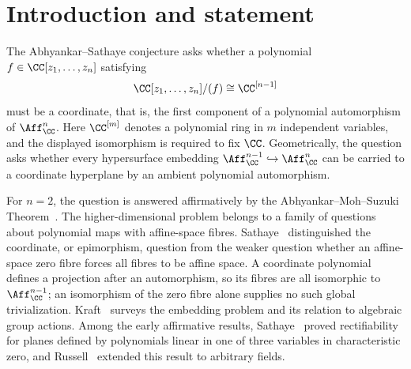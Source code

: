 \begin{abstract}
We construct an explicit counterexample to the Abhyankar--Sathaye conjecture:
a noncoordinate polynomial in four complex variables whose zero fibre is affine
three-space. Adjoining variables gives counterexamples in every ambient
dimension at least four.
\end{abstract}

\section{Introduction and statement}\label{sec:introduction}

The Abhyankar--Sathaye conjecture asks whether a polynomial
$f\in\CC[z_1,\ldots,z_n]$ satisfying
\[
  \CC[z_1,\ldots,z_n]/(f)\cong\CC^{[n-1]}
\]
must be a coordinate, that is, the first component of a polynomial automorphism
of $\Aff^n_{\CC}$.
Here $\CC^{[m]}$ denotes a polynomial ring in $m$ independent variables, and
the displayed isomorphism is required to fix $\CC$.
Geometrically, the question asks whether
every hypersurface embedding $\Aff^{n-1}_{\CC}\hookrightarrow\Aff^n_{\CC}$ can
be carried to a coordinate hyperplane by an ambient polynomial automorphism.

For $n=2$, the question is answered affirmatively by the
Abhyankar--Moh--Suzuki Theorem~\cite{AM,Suzuki}.
The higher-dimensional problem belongs to a family of questions about
polynomial maps with affine-space fibres. Sathaye~\cite[pp.~1--2]{Sathaye}
distinguished the coordinate, or epimorphism, question from the weaker question
whether an affine-space zero fibre forces all fibres to be affine space.
A coordinate polynomial defines a projection after an automorphism, so its
fibres are all isomorphic to $\Aff^{n-1}_{\CC}$; an isomorphism of the zero fibre
alone supplies no such global trivialization.
Kraft~\cite[\S4]{Kraft} surveys the embedding problem and its relation to
algebraic group actions. Among the early affirmative results,
Sathaye~\cite{Sathaye} proved rectifiability for planes defined by
polynomials linear in one of three variables in characteristic zero, and
Russell~\cite[Theorem~2.3]{Russell} extended this result to arbitrary fields.

